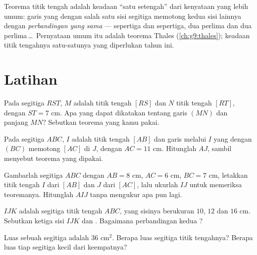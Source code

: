 \begin{remark}
Teorema titik tengah adalah keadaan ``satu setengah'' dari kenyataan
yang lebih umum: garis yang  dengan salah satu sisi segitiga
memotong kedua sisi lainnya dengan \emph{perbandingan yang sama} ---
sepertiga dan sepertiga, dua perlima dan dua
perlima\,\dots\ Pernyataan umum itu adalah teorema Thales
(\cref{ch:g9:thales}); keadaan titik tengahnya satu-satunya yang
diperlukan tahun ini.
\end{remark}

\section{Latihan}

\begin{exercise}[$\star$]\label{exo:g8:midpoints:1}
Pada segitiga $RST$, $M$ adalah titik tengah $[RS]$ dan $N$ titik
tengah $[RT]$, dengan $ST = 7$ cm. Apa yang dapat dikatakan tentang
garis $(MN)$ dan panjang $MN$? Sebutkan teorema yang kamu pakai.
\end{exercise}

\begin{exercise}[$\star$]\label{exo:g8:midpoints:2}
Pada segitiga $ABC$, $I$ adalah titik tengah $[AB]$ dan garis melalui
$I$ yang  dengan $(BC)$ memotong $[AC]$ di $J$, dengan
$AC = 11$ cm. Hitunglah $AJ$, sambil menyebut teorema yang dipakai.
\end{exercise}

\begin{exercise}[$\star$]\label{exo:g8:midpoints:3}
Gambarlah segitiga $ABC$ dengan $AB = 8$ cm, $AC = 6$ cm, $BC = 7$ cm,
letakkan titik tengah $I$ dari $[AB]$ dan $J$ dari $[AC]$, lalu ukurlah
$IJ$ untuk memeriksa teoremanya. Hitunglah  $AIJ$ tanpa
mengukur apa pun lagi.
\end{exercise}

\begin{exercise}[$\star$]\label{exo:g8:midpoints:4}
$IJK$ adalah segitiga titik tengah $ABC$, yang sisinya berukuran $10$,
$12$ dan $16$ cm. Sebutkan ketiga sisi $IJK$ dan .
Bagaimana perbandingan kedua ?
\end{exercise}

\begin{exercise}[$\star$]\label{exo:g8:midpoints:5}
Luas sebuah segitiga adalah $36$ cm$^2$. Berapa luas segitiga titik
tengahnya? Berapa luas tiap segitiga kecil dari keempatnya?
\end{exercise}

